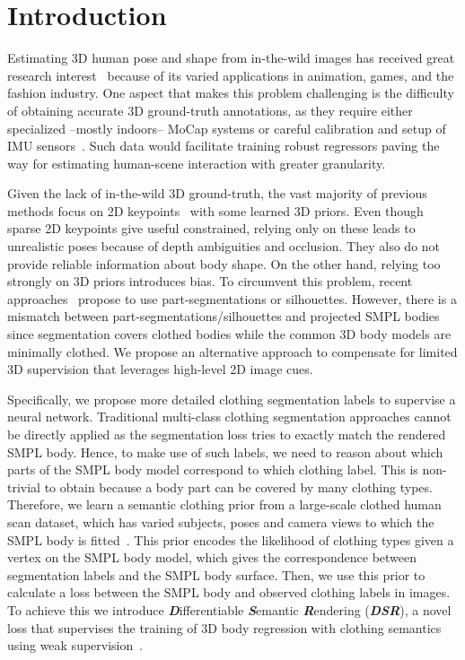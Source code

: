 \documentclass[10pt,twocolumn,letterpaper]{article}
\newcommand{\modelname}[0]{DSR\xspace}
\begin{document}
\section{Introduction}
Estimating 3D human pose and shape from in-the-wild images has received great research interest~\cite{smplify,eft, hmr,spin,Lassner2017UniteTP,nbf,pavlakos2018,densecor} because of its varied applications in animation, games, and the fashion industry.
One aspect that makes this problem challenging is the difficulty of obtaining accurate 3D ground-truth annotations, as they require either specialized --mostly indoors-- MoCap systems or careful calibration and setup of IMU sensors~\cite{vonMarcard2018}. 
Such data would facilitate training robust regressors paving the way for estimating human-scene interaction with greater granularity.

Given the lack of in-the-wild 3D ground-truth, the vast majority of previous methods focus on 2D keypoints~\cite{smplify, eft} with some learned 3D priors. Even though sparse 2D keypoints give useful constrained, relying only on these leads to unrealistic poses because of depth ambiguities and occlusion. 
They also do not provide reliable information about body shape.
On the other hand, relying too strongly on 3D priors introduces bias.
To circumvent this problem, recent approaches~\cite{nbf,pavlakos2018, denserac} propose to use part-segmentations or silhouettes. However, there is a mismatch between part-segmentations/silhouettes and projected SMPL bodies since segmentation covers clothed bodies while the common 3D body models are minimally clothed.
We propose an alternative approach to compensate for limited 3D supervision that leverages high-level 2D image cues. 


Specifically, we propose more detailed clothing segmentation labels to supervise a neural network. Traditional multi-class clothing segmentation approaches cannot be directly applied as the segmentation loss tries to exactly match the rendered SMPL body. Hence, to make use of such labels, we need to reason about which parts of the SMPL body model correspond to which clothing label. This is non-trivial to obtain because a body part can be covered by many clothing types. Therefore, we learn a semantic clothing prior from a large-scale clothed human scan dataset, which has varied subjects, poses and camera views to which the SMPL body is fitted~\cite{agora}. This prior encodes the likelihood of clothing types given a vertex on the SMPL body model, which gives the correspondence between segmentation labels and the SMPL body surface. Then, we use this prior to calculate a loss between the SMPL body and observed clothing labels in images. To achieve this we introduce \textbf{\textit{D}}ifferentiable \textbf{\textit{S}}emantic \textbf{\textit{R}}endering (\textbf{\textit{\modelname}}), a novel loss that supervises the training of 3D body regression with clothing semantics using weak supervision~\cite{graphonomy}.
\end{document}
